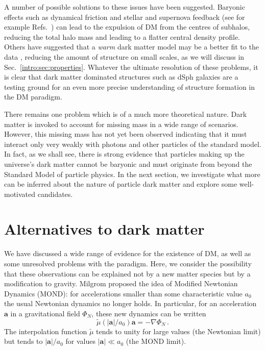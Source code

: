 A number of possible solutions to these issues have been suggested. Baryonic effects such as dynamical friction and stellar and supernova feedback (see for example Refs.~\cite{Gritschneder:2013, Amorisco:2014,DelPopolo:2014}) can lead to the expulsion of DM from the centres of subhalos, reducing the total halo mass and leading to a flatter central density profile. Others have suggested that a \textit{warm} dark matter model may be a better fit to the data \cite{Moore:1999, Bode:2001, Maccio:2010}, reducing the amount of structure on small scales, as we will discuss in Sec.~\ref{intro:sec:properties}. Whatever the ultimate resolution of these problems, it is clear that dark matter dominated structures such as dSph galaxies are a testing ground for an even more precise understanding of structure formation in the DM paradigm.

There remains one problem which is of a much more theoretical nature. Dark matter is invoked to account for missing mass in a wide range of scenarios. However, this missing mass has not yet been observed indicating that it must interact only very weakly with photons and other particles of the standard model. In fact, as we shall see, there is strong evidence that particles making up the universe's dark matter cannot be baryonic and must originate from beyond the Standard Model of particle physics. In the next section, we investigate what more can be inferred about the nature of particle dark matter and explore some well-motivated candidates.



\section{Alternatives to dark matter}

We have discussed a wide range of evidence for the existence of DM, as well as some unresolved problems with the \LCDM paradigm. Here, we consider the possibility that these observations can be explained not by a new matter species but by a modification to gravity. Milgrom \cite{Milgrom:1983a, Milgrom:1983b, Milgrom:1983c} proposed the idea of Modified Newtonian Dynamics (MOND): for accelerations smaller than some characteristic value $a_0$ the usual Newtonian dynamics no longer holds. In particular, for an acceleration $\mathbf{a}$ in a gravitational field $\Phi_N$, these new dynamics can be written
\begin{equation}
\label{eq:intro:MOND}
\tilde{\mu}(|\mathbf{a}|/a_0)\mathbf{a} = -\nabla \Phi_N\,.
\end{equation}
The interpolation function $\tilde{\mu}$ tends to unity for large values (the Newtonian limit) but tends to $|\mathbf{a}|/a_0$ for values $|\mathbf{a}| \ll a_0$ (the MOND limit).

